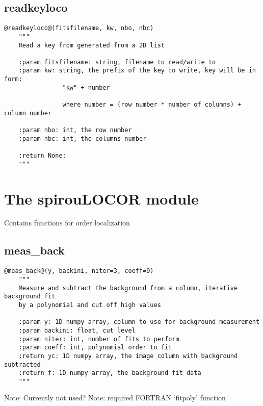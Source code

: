 \vspace{0.5cm}
\subsection{readkeyloco}
\begin{lstlisting}[style=pythonstyle]
@readkeyloco@(fitsfilename, kw, nbo, nbc)
    """
    Read a key from generated from a 2D list

    :param fitsfilename: string, filename to read/write to
    :param kw: string, the prefix of the key to write, key will be in form:
                "kw" + number
                
                where number = (row number * number of columns) + column number
                
    :param nbo: int, the row number
    :param nbc: int, the columns number
    
    :return None:
    """
\end{lstlisting}

\clearpage
\newpage
\section{The spirouLOCOR module}

Contains functions for order localization

\vspace{0.5cm}
\subsection{meas\_back}
\begin{lstlisting}[style=pythonstyle]
@meas_back@(y, backini, niter=3, coeff=9)
    """
    Measure and subtract the background from a column, iterative background fit
    by a polynomial and cut off high values
    
    :param y: 1D numpy array, column to use for background measurement
    :param backini: float, cut level
    :param niter: int, number of fits to perform
    :param coeff: int, polynomial order to fit
    :return yc: 1D numpy array, the image column with background subtracted
    :return f: 1D numpy array, the background fit data
    """
\end{lstlisting}

\noindent Note: Currently not used?
\noindent Note: required FORTRAN `fitpoly' function

